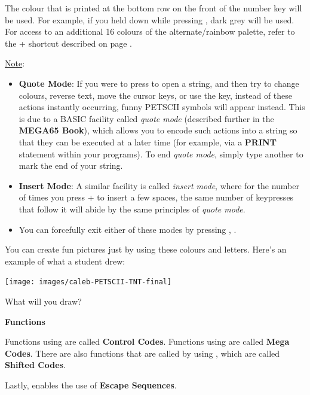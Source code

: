 The colour that is printed at the bottom row on the front of the number key will be used. For example, if you held
\megasymbolkey down while pressing , dark grey will be used. For access to an additional 16 colours of the alternate/rainbow palette, refer to the  +  shortcut described on page \pageref{appendix:controlcodes}.

\underline{Note}:
\begin{itemize}
  \item {\bf Quote Mode}: If you were to press  to open a string, and then try to change
colours, reverse text, move the cursor keys, or use the  key, instead
of these actions instantly occurring, funny PETSCII symbols will appear instead. This is
due to a BASIC facility called {\it quote mode} (described further in the \textbf{MEGA65 Book}),
which allows you to encode such actions into a string so that they can be executed at a later
time (for example, via a {\bf PRINT} statement within your programs). To end {\it quote mode}, simply
type another  to mark the end of your string.
  \item {\bf Insert Mode}: A similar facility is called
{\it insert mode}, where for the number of times you press  + 
to insert a few spaces, the same number of keypresses that follow it will abide by the same
principles of {\it quote mode}.
  \item You can forcefully exit either of these modes by pressing , .
\end{itemize}

\needspace{4cm}
You can create fun pictures just by using these colours and letters. Here's an example of what a student drew:

\begin{center}
\texttt{[image: images/caleb-PETSCII-TNT-final]}
\end{center}

What will you draw?

\needspace{2cm}
\textbf{Functions}

Functions using  are called \textbf{Control Codes}.
Functions using \megasymbolkey are called \textbf{Mega Codes}. There are also functions that are called by using , which are called \textbf{Shifted Codes}.

Lastly,  enables the use of \textbf{Escape Sequences}.

